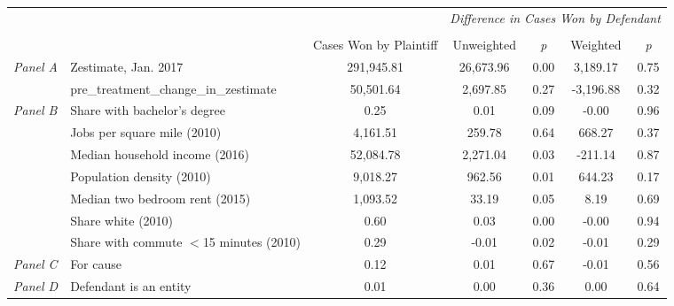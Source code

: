 \begin{tabular}{llccccc}
\toprule
 &  & \textit{} & \multicolumn{4}{c}{\textit{Difference in Cases Won by Defendant}} \\
\cline{4-7}
\\
 &  & Cases Won by Plaintiff & Unweighted & \emph{p} & Weighted & \emph{p} \\
\midrule
\multirow[c]{2}{3cm}{\textit{Panel A}} & Zestimate, Jan. 2017 & 291,945.81 & 26,673.96 & 0.00 & 3,189.17 & 0.75 \\
 & pre_treatment_change_in_zestimate & 50,501.64 & 2,697.85 & 0.27 & -3,196.88 & 0.32 \\
\cline{1-7}
\multirow[c]{7}{3cm}{\textit{Panel B}} & Share with bachelor's degree & 0.25 & 0.01 & 0.09 & -0.00 & 0.96 \\
 & Jobs per square mile (2010) & 4,161.51 & 259.78 & 0.64 & 668.27 & 0.37 \\
 & Median household income (2016) & 52,084.78 & 2,271.04 & 0.03 & -211.14 & 0.87 \\
 & Population density (2010) & 9,018.27 & 962.56 & 0.01 & 644.23 & 0.17 \\
 & Median two bedroom rent (2015) & 1,093.52 & 33.19 & 0.05 & 8.19 & 0.69 \\
 & Share white (2010) & 0.60 & 0.03 & 0.00 & -0.00 & 0.94 \\
 & Share with commute $<$15 minutes (2010) & 0.29 & -0.01 & 0.02 & -0.01 & 0.29 \\
\cline{1-7}
\textit{Panel C} & For cause & 0.12 & 0.01 & 0.67 & -0.01 & 0.56 \\
\cline{1-7}
\textit{Panel D} & Defendant is an entity & 0.01 & 0.00 & 0.36 & 0.00 & 0.64 \\
\cline{1-7}
\bottomrule
\end{tabular}
